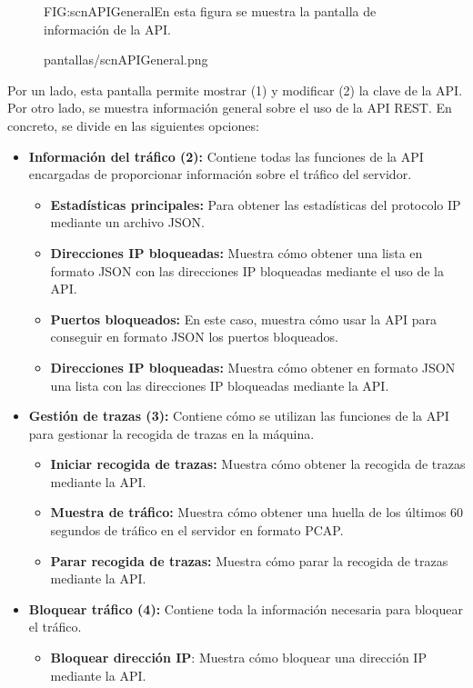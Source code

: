 
\begin{figure}[Pantalla información de la API]{FIG:scnAPIGeneral}{En esta figura se muestra la pantalla de información de la API.}
  \begin{image}{}{}{pantallas/scnAPIGeneral.png}
  \end{image}
\end{figure}
\break
Por un lado, esta pantalla permite mostrar (1) y modificar (2) la clave de la API. Por otro lado, se muestra información general sobre el uso de la API REST. En concreto, se divide en las siguientes opciones:
\begin{itemize}
\item \textbf{Información del tráfico (2):} Contiene todas las funciones de la API encargadas de proporcionar información sobre el tráfico del servidor.
\begin{itemize}
\item \textbf{Estadísticas principales:} Para obtener las estadísticas del protocolo IP mediante un archivo JSON.
\item \textbf{Direcciones IP bloqueadas:} Muestra cómo obtener una lista en formato JSON con las direcciones IP bloqueadas mediante el uso de la API.
\item \textbf{Puertos bloqueados: }En este caso, muestra cómo usar la API para conseguir en formato JSON los puertos bloqueados.
\item \textbf{Direcciones IP bloqueadas:} Muestra cómo obtener en formato JSON una lista con las direcciones IP bloqueadas mediante la API. 
\end{itemize}
\item \textbf{Gestión de trazas (3): }Contiene cómo se utilizan las funciones de la API para gestionar la recogida de trazas en la máquina.
\begin{itemize}
\item \textbf{Iniciar recogida de trazas:} Muestra cómo obtener la recogida de trazas mediante la API.
\item \textbf{Muestra de tráfico:} Muestra cómo obtener una huella de los últimos 60 segundos de tráfico en el servidor en formato PCAP.
\item \textbf{Parar recogida de trazas: }Muestra cómo parar la recogida de trazas mediante la API.
\end{itemize}
\item \textbf{Bloquear tráfico (4):} Contiene toda la información necesaria para bloquear el tráfico.
\begin{itemize}
\item \textbf{Bloquear dirección IP}: Muestra cómo bloquear una dirección IP mediante la API.

\end{itemize}
\end{itemize}
